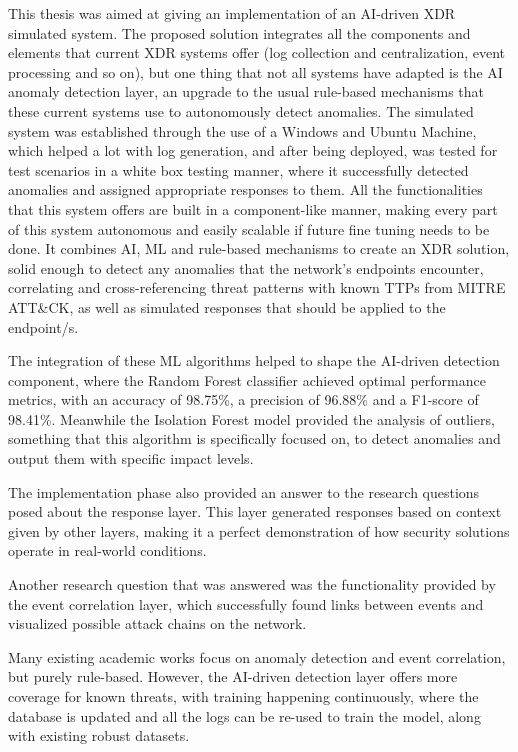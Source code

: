 \documentclass[12pt,a4paper]{report}
\begin{document}
This thesis was aimed at giving an implementation of an AI-driven XDR simulated system. The
proposed solution integrates all the components and elements that current XDR systems offer (log
collection and centralization, event processing and so on), but one thing that not all systems
have adapted is the AI anomaly detection layer, an upgrade to the usual rule-based mechanisms
that these current systems use to autonomously detect anomalies. The simulated system was
established through the use of a Windows and Ubuntu Machine, which helped a lot with log
generation, and after being deployed, was tested for test scenarios in a white box testing
manner, where it successfully detected anomalies and assigned appropriate responses to them. All
the functionalities that this system offers are built in a component-like manner, making every
part of this system autonomous and easily scalable if future fine tuning needs to be done. It
combines AI, ML and rule-based mechanisms to create an XDR solution, solid enough to detect any
anomalies that the network's endpoints encounter, correlating and cross-referencing threat
patterns with known TTPs from MITRE ATT\&CK, as well as simulated responses that should be
applied to the endpoint/s.

The integration of these ML algorithms helped to shape the AI-driven detection component, where
the Random Forest classifier achieved optimal performance metrics, with an accuracy of 98.75\%, a
precision of 96.88\% and a F1-score of 98.41\%. Meanwhile the Isolation Forest model provided
the analysis of outliers, something that this algorithm is specifically focused on, to detect
anomalies and output them with specific impact levels.

The implementation phase also provided an answer to the research questions posed about the
response layer. This layer generated responses based on context given by other layers, making it
a perfect demonstration of how security solutions operate in real-world conditions.

Another research question that was answered was the functionality provided by the event
correlation layer, which successfully found links between events and visualized possible attack
chains on the network.

Many existing academic works focus on anomaly detection and event correlation, but purely
rule-based. However, the AI-driven detection layer offers more coverage for known threats, with
training happening continuously, where the database is updated and all the logs can be re-used
to train the model, along with existing robust datasets.
\end{document}
